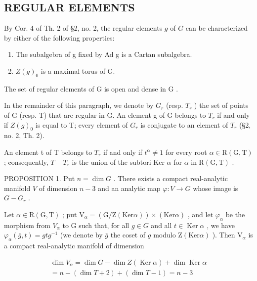 \subsection{REGULAR ELEMENTS}

By Cor. 4 of Th. 2 of §2, no. 2, the regular elements \(g\) of \(G\) can be characterized by either of the following properties:

\begin{enumerate}
\def\labelenumi{\alph{enumi})}
\item
  The subalgebra of g fixed by Ad g is a Cartan subalgebra.
\item
  \(Z(g)_{0}\) is a maximal torus of G.
\end{enumerate}

The set of regular elements of \(\mathrm{G}\) is open and dense in \(\mathrm{G}\) .

In the remainder of this paragraph, we denote by \(G_{r}\) (resp. \(T_{r}\) ) the set of points of G (resp. T) that are regular in G. An element g of G belongs to \(T_{r}\) if and only if \(Z(g)_{0}\) is equal to T; every element of \(G_{r}\) is conjugate to an element of \(T_{r}\) (§2, no. 2, Th. 2).

An element t of T belongs to \(T_{r}\) if and only if \(t^{\alpha} \neq 1\) for every root \(\alpha \in \mathrm{R}(\mathrm{G}, \mathrm{T})\) ; consequently, \(T - T_{r}\) is the union of the subtori Ker \(\alpha\) for \(\alpha\) in \(\mathrm{R}(\mathrm{G}, \mathrm{T})\) .

PROPOSITION 1. Put \(n = \dim G\) . There exists a compact real-analytic manifold \(V\) of dimension \(n - 3\) and an analytic map \(\varphi : V \to G\) whose image is \(G - G_r\) .

Let \(\alpha\in\mathrm{R}(\mathrm{G},\mathrm{T})\) ; put \(\mathrm{V}_{\alpha}=(\mathrm{G}/\mathrm{Z}(\mathrm{Ker}\alpha))\times(\mathrm{Ker}\alpha)\) , and let \(\varphi_{\alpha}\) be the morphism from \(V_{\alpha}\) to G such that, for all \(g\in G\) and all \(t\in\operatorname{Ker}\alpha\) , we have \(\varphi_{\alpha}(\bar{g},t) = gtg^{-1}\) (we denote by \(\bar{g}\) the coset of \(g\) modulo \(\mathrm{Z}(\mathrm{Ker}\alpha)\) ). Then \(\mathrm{V}_{\alpha}\) is a compact real-analytic manifold of dimension

\[
\begin{array}{c} \dim V _ {\alpha} = \dim G - \dim Z (\operatorname{Ker} \alpha) + \dim \operatorname{Ker} \alpha \\ = n - (\dim T + 2) + (\dim T - 1) = n - 3 \end{array}
\]

